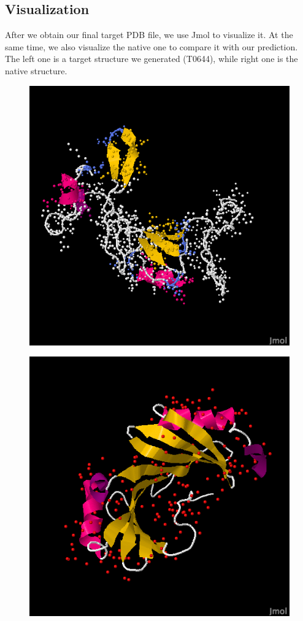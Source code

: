 \documentclass{article}
\begin{document}
\begin{enumerate}
\newpage
\section{Visualization}

After we obtain our final target PDB file, we use Jmol to visualize it. At the same time, we also visualize the native one to compare it with our prediction.  The left one is a target structure we generated (T0644), while right one is the native structure.

\begin{figure}
\centering
\begin{minipage}{.5\textwidth}
  \centering
  \includegraphics[width=.9\linewidth]{target_group_v2}
  \label{fig:test1}
\end{minipage}%
\begin{minipage}{.5\textwidth}
  \centering
  \includegraphics[width=.9\linewidth]{target_native}

\end{minipage}
\end{figure}
\end{enumerate}
\end{document}
